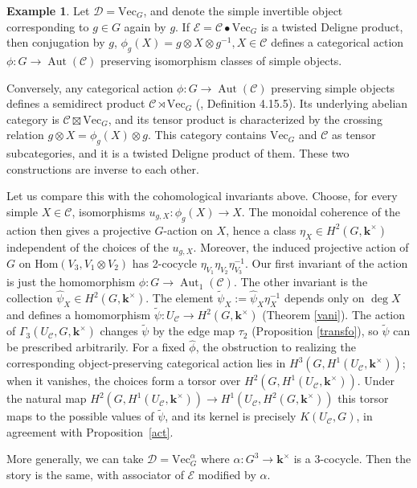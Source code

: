 \documentclass[12pt]{amsart}
\numberwithin{equation}{section}
\theoremstyle{definition}
\newtheorem{example}[theorem]{Example}
\newcommand{\Hom}{\text{Hom}}
\newcommand{\Aut}{\text{Aut}}
\newcommand{\1}{_{(1)}}
\newcommand{\2}{_{(2)}}
\newcommand{\3}{_{(3)}}
\newcommand{\4}{_{(4)}}
\newcommand{\5}{_{(5)}}
\newcommand{\6}{_{(6)}}
\newcommand{\C}{\mathcal{C}}
\theoremstyle{plain}
\theoremstyle{definition}
\theoremstyle{remark}
\def\C{\mathcal{C}}
\def\D{\mathcal{D}}
\def\E{\mathcal{E}}
\def\Aut{\mathop{\mathrm{Aut}}\nolimits}
\def\Hom{\mathrm{Hom}}
\def\Vec{\mathrm{Vec}}
\def\k{\mathbf{k}}
\begin{document}
\begin{example} \label{smashpro}
Let \(\D=\Vec_G\), and denote the simple invertible object corresponding to \(g\in G\) again by \(g\).  If \(\E=\C\bullet \Vec_G\) is a twisted Deligne product, then conjugation by \(g\),
$\phi_g(X)=g\otimes X\otimes g^{-1}, X\in\C$ defines a categorical action \(\phi:G\to\Aut(\C)\) preserving isomorphism classes of simple objects.  

Conversely, any categorical action \(\phi:G\to\Aut(\C)\) preserving simple objects defines a semidirect product \(\C\rtimes \Vec_G\) (\cite{EGNO}, Definition 4.15.5).  Its underlying abelian category is \(\C\boxtimes \Vec_G\),
 and its tensor product is characterized by the crossing relation
$g\otimes X=\phi_g(X)\otimes g$.
This category contains \(\Vec_G\) and \(\C\) as tensor subcategories, and it is a twisted Deligne product of them.  These two constructions are inverse to each other.

Let us compare this with the cohomological invariants above.  Choose, for every simple \(X\in\C\), isomorphisms \(u_{g,X}:\phi_g(X)\to X\).  The monoidal coherence of the action then gives a projective \(G\)-action on \(X\), hence a class $\eta_X\in H^2(G,\k^\times)$
independent of the choices of the \(u_{g,X}\).  Moreover, the induced projective action of \(G\) on \(\Hom(V_3,V_1\otimes V_2)\) has 2-cocycle
$\eta_{V_1}\eta_{V_2}\eta_{V_3}^{-1}$.
Our first invariant of the action is just the homomorphism
$\phi: G\to\Aut_1(\C)$. The other invariant is the collection \(\widehat\psi_X\in H^2(G,\k^\times)\).  The element
$\widetilde\psi_X:=\widehat\psi_X\eta_X^{-1}$ 
depends only on \(\deg X\) and defines a homomorphism
$\widetilde\psi:U_\C\to H^2(G,\k^\times)$ (Theorem \ref{vani}). 
The action of \(\Gamma_3(U_\C,G,\k^\times)\) changes \(\widetilde\psi\) by the edge map \(\tau_2\) (Proposition \ref{transfo}),
so \(\widetilde\psi\) can be prescribed arbitrarily.  For a fixed \(\widehat \phi\), the obstruction to realizing the corresponding object-preserving categorical action lies in \(H^3(G,H^1(U_\C,\k^\times))\); when it vanishes, the choices form a torsor over \(H^2(G,H^1(U_\C,\k^\times))\).  Under the natural map
$H^2(G,H^1(U_\C,\k^\times))\to H^1(U_\C,H^2(G,\k^\times))$
this torsor maps to the possible values of \(\widetilde\psi\), and its kernel is precisely \(K(U_\C,G)\), in agreement with Proposition~\ref{act}.

More generally, we can take $\D=\Vec_G^\alpha$ where $\alpha: G^3\to \k^\times$ is a 3-cocycle. Then the story is the same, with associator of $\E$ modified by $\alpha$.
\end{example}
\end{document}
